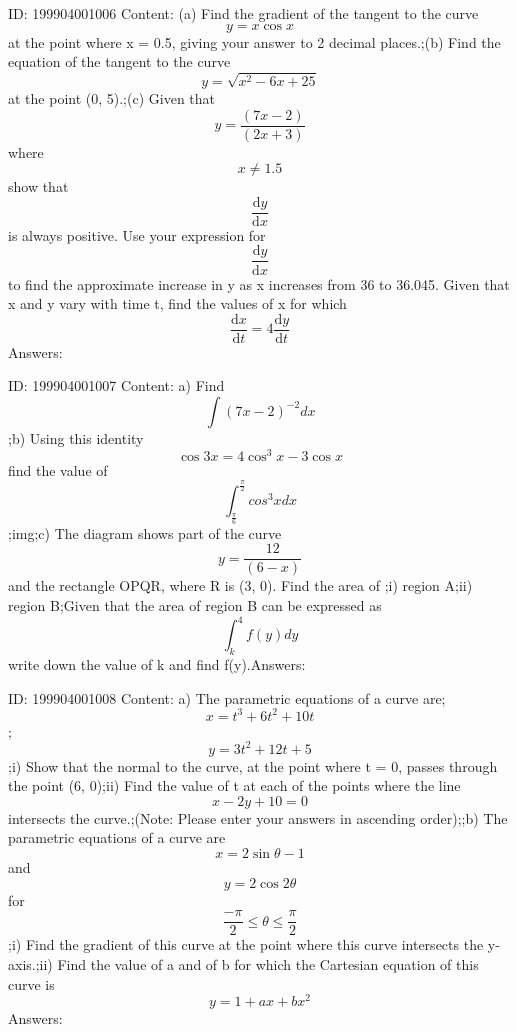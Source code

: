 \documentclass{article}
\begin{document}
ID: 199904001006
Content:
(a)	Find the gradient of the tangent to the curve \[y = x \cos x \] at the point where x = 0.5, giving your answer to 2 decimal places.;(b)	Find the equation of the tangent to the curve \[y=\sqrt{x^2-6x+25} \] at the point (0, 5).;(c)	Given that \[y=\frac{(7x-2)}{(2x+3)}\] where \[x\neq 1.5\] show that \[\frac{\mathrm{d} y}{\mathrm{d} x}\] is always positive. Use your expression for \[\frac{\mathrm{d} y}{\mathrm{d} x}\] to find the approximate increase in y as x increases from 36 to 36.045. Given that x and y vary with time t, find the values of x for which \[\frac{\mathrm{d} x}{\mathrm{d} t}=4\frac{\mathrm{d} y}{\mathrm{d} t}\]Answers:

ID: 199904001007
Content:
a) Find \[\int(7x-2)^{-2}dx\];b) Using this identity \[\cos3x=4\cos^3x-3\cos x\]  find the value of \[\int_\frac{\pi }{6}^\frac{\pi }{2}cos^3xdx\] ;img;c) The diagram shows part of the curve \[y=\frac{12}{(6-x)}\] and the rectangle OPQR, where R is (3, 0). Find the area of ;i) region A;ii) region B;Given that the area of region B can be expressed as \[\int_k^4f(y)dy\] write down the value of k and find f(y).Answers:

ID: 199904001008
Content:
a) The parametric equations of a curve are; \[x=t^3+6t^2+10t\]; \[y=3t^2+12t+5\];i) Show that the normal to the curve, at the point where t = 0, passes through the point (6, 0);ii) Find the value of t at each of the points where the line \[x-2y +10 = 0\] intersects the curve.;(Note: Please enter your answers in ascending order);;b) The parametric equations of a curve are \[x=2\sin\theta-1\] and \[y=2\cos2\theta\] for \[\frac{-\pi }{2}\leq \theta\leq \frac{\pi }{2}\];i) Find the gradient of this curve at the point where this curve intersects the y-axis.;ii) Find the value of a and of b for which the Cartesian equation of this curve is \[y=1+ax+bx^2\]Answers:
\end{document}
